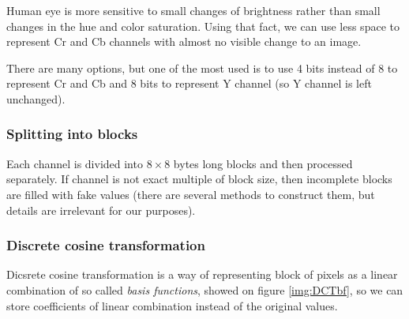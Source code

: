 Human eye is more sensitive to small changes of brightness rather 
than small changes in the hue and color saturation. Using that fact, 
we can use less space to represent Cr and Cb channels with almost no visible change
to an image. 

There are many options, but one of the most used is to use 4 bits instead of 8
to represent Cr and Cb and 8 bits to represent Y channel (so Y channel is left unchanged).

\subsubsection{Splitting into blocks}

Each channel is divided into $8 \times 8$ bytes long blocks and 
then processed separately. If channel is not exact multiple of block size,
then incomplete blocks are filled with fake values (there are several
methods to construct them, but details are irrelevant for our purposes).

\subsubsection{Discrete cosine transformation}

Dicsrete cosine transformation is a way of representing block of pixels as 
a linear combination of so called \textit{basis functions}, showed on figure \ref{img:DCTbf},
so we can store coefficients of linear combination instead of the original values.

